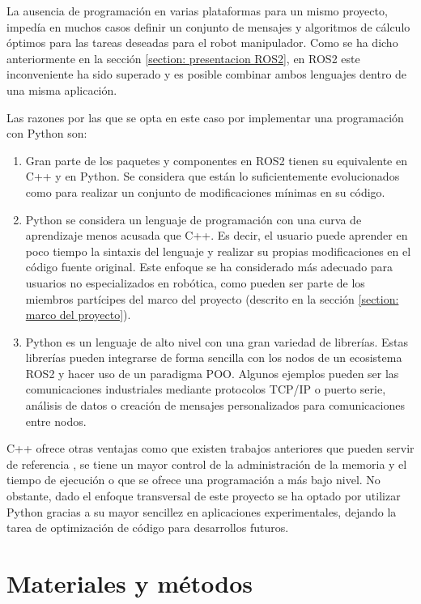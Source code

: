 La ausencia de programación en varias plataformas para un mismo proyecto, impedía en muchos casos definir un conjunto de mensajes y algoritmos de cálculo óptimos para las tareas deseadas para el robot manipulador. Como se ha dicho anteriormente en la sección \ref{section: presentacion ROS2}, en ROS2 este inconveniente ha sido superado y es posible combinar ambos lenguajes dentro de una misma aplicación.

Las razones por las que se opta en este caso por implementar una programación con Python son:
\begin{enumerate}
    \item Gran parte de los paquetes y componentes en ROS2 tienen su equivalente en C++ y en Python. Se considera que están lo suficientemente evolucionados como para realizar un conjunto de modificaciones mínimas en su código.
    \item Python se considera un lenguaje de programación con una curva de aprendizaje menos acusada que C++. Es decir, el usuario puede aprender en poco tiempo la sintaxis del lenguaje y realizar su propias modificaciones en el código fuente original. Este enfoque se ha considerado más adecuado para usuarios no especializados en robótica, como pueden ser parte de los miembros partícipes del marco del proyecto (descrito en la sección \ref{section:  marco del proyecto}).
    \item Python es un lenguaje de alto nivel con una gran variedad de librerías. Estas librerías pueden integrarse de forma sencilla con los nodos de un ecosistema ROS2 y hacer uso de un paradigma \acrshort{POO}. Algunos ejemplos pueden ser las comunicaciones industriales mediante protocolos \acrshort{TCP/IP} o puerto serie, análisis de datos o creación de mensajes personalizados para comunicaciones entre nodos.
\end{enumerate}

C++ ofrece otras ventajas como que existen trabajos anteriores que pueden servir de referencia \cite{TFM_Lu}, se tiene un mayor control de la administración de la memoria y el tiempo de ejecución o que se ofrece una programación a más bajo nivel. No obstante, dado el enfoque transversal de este proyecto se ha optado por utilizar Python gracias a su mayor sencillez en aplicaciones experimentales, dejando la tarea de optimización de código para desarrollos futuros.

\section{Materiales y métodos}
